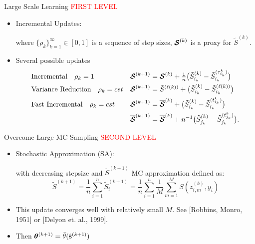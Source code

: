 \documentclass[10pt]{beamer}
\begin{document}
\begin{frame}{Large Scale Learning}
\textcolor{red}{FIRST LEVEL}
\begin{itemize}
\item Incremental Updates:
\begin{center}
\end{center}
where $\{ \rho_{k} \}_{k=1}^\infty \in [0,1]$ is a sequence of step sizes, ${\bm{\mathcal{S}}}^{(k)}$ is a proxy for $\tilde{S}^{(k)}$.
\item Several possible updates
\begin{align}
& \textrm{Incremental} \quad \rho_k = 1 & {\bm{\mathcal{S}}}^{(k+1)} &= {\bm{\mathcal{S}}}^{(k)} + {\textstyle \frac{1}{n}}\big( \tilde{S}_{i_k}^{(k)}  - \tilde{S}_{i_k}^{(\tau_{i_k}^k)} \big)\notag\\
& \textrm{Variance Reduction} \quad \rho_k = cst & {\bm{\mathcal{S}}}^{(k+1)} &= \tilde{S}^{(\ell(k))} +  \big( \tilde{S}_{i_k}^{(k)}  -\tilde{S}_{i_k}^{(\ell(k))}\big)  \notag\\
& \textrm{Fast Incremental} \quad \rho_k = cst &{\bm{\mathcal{S}}}^{(k+1)} &= \overline{{\bm{\mathcal{S}}}}^{(k)} + \big( \tilde{S}_{i_k}^{(k)}  - \tilde{S}_{i_k}^{(t_{i_k}^k)} \big)\notag\\
&    &\overline{{\bm{\mathcal{S}}}}^{(k+1)} &= \overline{{\bm{\mathcal{S}}}}^{(k)} + n^{-1} \big( \tilde{S}_{j_k}^{(k)}  - \tilde{S}_{j_k}^{(t_{j_k}^k)} \big).\notag
\end{align}
\end{itemize}
\end{frame}


\begin{frame}{Overcome Large MC Sampling}
\textcolor{red}{SECOND LEVEL}
\begin{itemize}
\item Stochastic Approximation (SA):
\begin{center}
\end{center}
with decreasing stepsize and $\tilde{S}^{(k+1)}$ MC approximation defined as:
$$
\tilde{S}^{(k+1)} = \frac{1}{n} \sum_{i=1}^n \tilde{S}^{(k+1)}_i = \frac{1}{n} \sum_{i=1}^n\frac{1}{M} \sum_{m=1}^M S(z_{i,m}^{(k)}, y_i)
$$
\item This update converges well with relatively small $M$. See [Robbins, Monro, 1951] or [Delyon et. al., 1999].
\item Then ${\bm{\theta}}^{(k+1)} = \bar{\theta}(\hat{{\mathbf{s}}}^{(k+1)})$
\end{itemize}

\end{frame}
\end{document}
